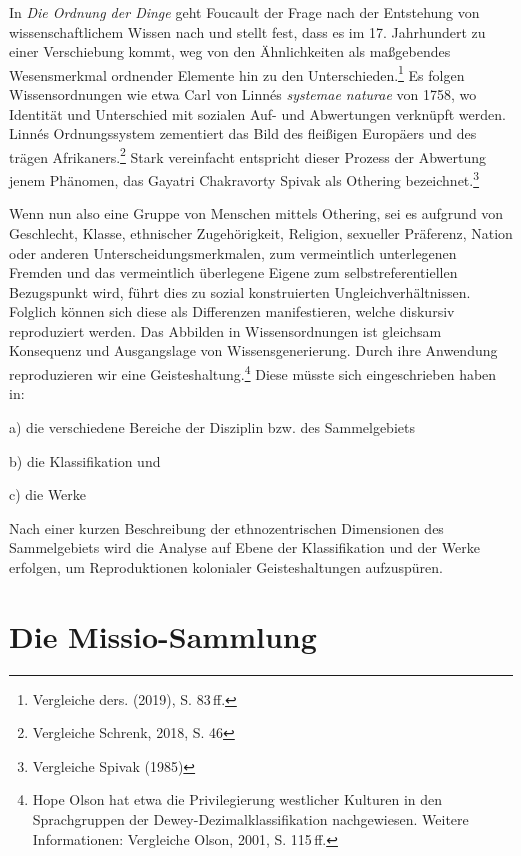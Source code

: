 \documentclass[a4paper,
fontsize=11pt,
oneside,
numbers=noperiodatend,
parskip=half-,
bibliography=totoc,
final
]{scrartcl}
\begin{document}
In \emph{Die Ordnung der Dinge} geht Foucault der Frage nach der
Entstehung von wissenschaftlichem Wissen nach und stellt fest, dass es
im 17. Jahrhundert zu einer Verschiebung kommt, weg von den
Ähnlichkeiten als maßgebendes Wesensmerkmal ordnender Elemente hin zu
den Unterschieden.\footnote{Vergleiche ders. (2019), S. 83\,ff.} Es
folgen Wissensordnungen wie etwa Carl von Linnés \emph{systemae naturae}
von 1758, wo Identität und Unterschied mit sozialen Auf- und Abwertungen
verknüpft werden. Linnés Ordnungssystem zementiert das Bild des
fleißigen Europäers und des trägen Afrikaners.\footnote{Vergleiche
  Schrenk, 2018, S. 46} Stark vereinfacht entspricht dieser Prozess der
Abwertung jenem Phänomen, das Gayatri Chakravorty Spivak als Othering
bezeichnet.\footnote{Vergleiche Spivak (1985)}

Wenn nun also eine Gruppe von Menschen mittels Othering, sei es aufgrund
von Geschlecht, Klasse, ethnischer Zugehörigkeit, Religion, sexueller
Präferenz, Nation oder anderen Unterscheidungsmerkmalen, zum
vermeintlich unterlegenen Fremden und das vermeintlich überlegene Eigene
zum selbstreferentiellen Bezugspunkt wird, führt dies zu sozial
konstruierten Ungleichverhältnissen. Folglich können sich diese als
Differenzen manifestieren, welche diskursiv reproduziert werden. Das
Abbilden in Wissensordnungen ist gleichsam Konsequenz und Ausgangslage
von Wissensgenerierung. Durch ihre Anwendung reproduzieren wir eine
Geisteshaltung.\footnote{Hope Olson hat etwa die Privilegierung
  westlicher Kulturen in den Sprachgruppen der
  Dewey-Dezimalklassifikation nachgewiesen. Weitere Informationen:
  Vergleiche Olson, 2001, S. 115\,ff.} Diese müsste sich eingeschrieben
haben in:

a) die verschiedene Bereiche der Disziplin bzw. des Sammelgebiets

b) die Klassifikation und

c) die Werke

Nach einer kurzen Beschreibung der ethnozentrischen Dimensionen des
Sammelgebiets wird die Analyse auf Ebene der Klassifikation und der
Werke erfolgen, um Reproduktionen kolonialer Geisteshaltungen
aufzuspüren.

\hypertarget{die-missio-sammlung}{%
\section{Die Missio-Sammlung}\label{die-missio-sammlung}}
\end{document}

